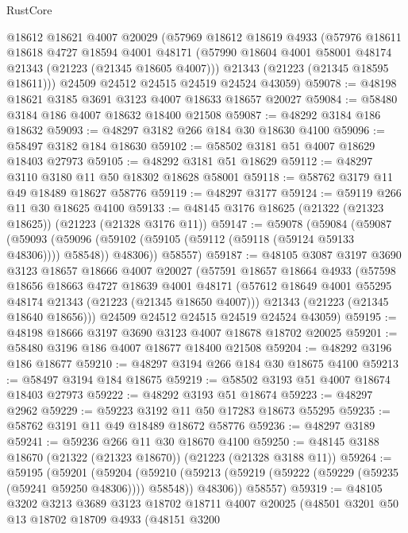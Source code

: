 \begin{lexlean}{RustCore}
\begin{coremodule}
    @18612
    @18621
    @4007
    @20029
    (@57969
      @18612
      @18619
      @4933
      (@57976
        @18611
        @18618
        @4727
        @18594
        @4001
        @48171
        (@57990 @18604 @4001 @58001 @48174 @21343 (@21223 (@21345 @18605 @4007)))
        @21343
        (@21223 (@21345 @18595 @18611)))
      @24509
      @24512
      @24515
      @24519
      @24524
      @43059)
@59078 := @48198 @18621 @3185 @3691 @3123 @4007 @18633 @18657 @20027
@59084 := @58480 @3184 @186 @4007 @18632 @18400 @21508
@59087 := @48292 @3184 @186 @18632
@59093 := @48297 @3182 @266 @184 @30 @18630 @4100
@59096 := @58497 @3182 @184 @18630
@59102 := @58502 @3181 @51 @4007 @18629 @18403 @27973
@59105 := @48292 @3181 @51 @18629
@59112 := @48297 @3110 @3180 @11 @50 @18302 @18628 @58001
@59118 := @58762 @3179 @11 @49 @18489 @18627 @58776
@59119 := @48297 @3177
@59124 := @59119 @266 @11 @30 @18625 @4100
@59133 := @48145 @3176 @18625 (@21322 (@21323 @18625)) (@21223 (@21328 @3176 @11))
@59147 := @59078
    (@59084
      (@59087
        (@59093 (@59096 (@59102 (@59105 (@59112 (@59118 (@59124 @59133 @48306)))) @58548)) @48306))
      @58557)
@59187 := @48105
    @3087
    @3197
    @3690
    @3123
    @18657
    @18666
    @4007
    @20027
    (@57591
      @18657
      @18664
      @4933
      (@57598
        @18656
        @18663
        @4727
        @18639
        @4001
        @48171
        (@57612 @18649 @4001 @55295 @48174 @21343 (@21223 (@21345 @18650 @4007)))
        @21343
        (@21223 (@21345 @18640 @18656)))
      @24509
      @24512
      @24515
      @24519
      @24524
      @43059)
@59195 := @48198 @18666 @3197 @3690 @3123 @4007 @18678 @18702 @20025
@59201 := @58480 @3196 @186 @4007 @18677 @18400 @21508
@59204 := @48292 @3196 @186 @18677
@59210 := @48297 @3194 @266 @184 @30 @18675 @4100
@59213 := @58497 @3194 @184 @18675
@59219 := @58502 @3193 @51 @4007 @18674 @18403 @27973
@59222 := @48292 @3193 @51 @18674
@59223 := @48297 @2962
@59229 := @59223 @3192 @11 @50 @17283 @18673 @55295
@59235 := @58762 @3191 @11 @49 @18489 @18672 @58776
@59236 := @48297 @3189
@59241 := @59236 @266 @11 @30 @18670 @4100
@59250 := @48145 @3188 @18670 (@21322 (@21323 @18670)) (@21223 (@21328 @3188 @11))
@59264 := @59195
    (@59201
      (@59204
        (@59210 (@59213 (@59219 (@59222 (@59229 (@59235 (@59241 @59250 @48306)))) @58548)) @48306))
      @58557)
@59319 := @48105
    @3202
    @3213
    @3689
    @3123
    @18702
    @18711
    @4007
    @20025
    (@48501
      @3201
      @50
      @13
      @18702
      @18709
      @4933
      (@48151
        @3200

\end{coremodule}
\end{lexlean}
